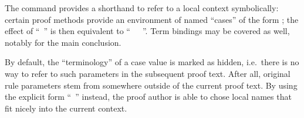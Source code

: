 \begin{isabellebody}
\begin{isamarkuptext}
  The \hyperlink{command.case}{\mbox{}} command provides a shorthand to refer to a
  local context symbolically: certain proof methods provide an
  environment of named ``cases'' of the form ; the effect of ``\hyperlink{command.case}{\mbox{}}~'' is then equivalent to ``\hyperlink{command.fix}{\mbox{}}~~\hyperlink{command.assume}{\mbox{}}~''.  Term bindings may be covered as well, notably
  \hyperlink{variable.?case}{\mbox{}} for the main conclusion.

  By default, the ``terminology''  of
  a case value is marked as hidden, i.e.\ there is no way to refer to
  such parameters in the subsequent proof text.  After all, original
  rule parameters stem from somewhere outside of the current proof
  text.  By using the explicit form ``\hyperlink{command.case}{\mbox{}}~'' instead, the proof author is able to
  chose local names that fit nicely into the current context.


\end{isamarkuptext}
\end{isabellebody}
